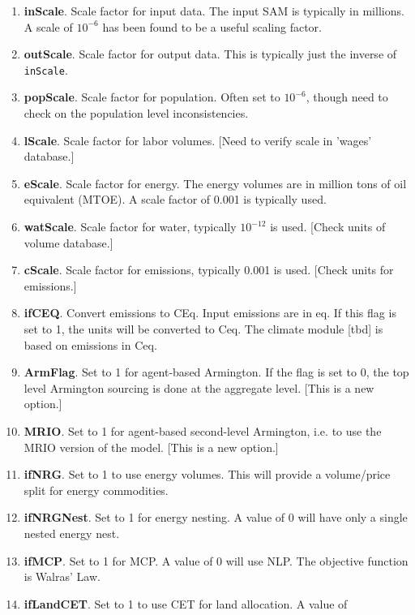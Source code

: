 \begin{enumerate}
   \item \textbf{inScale}. Scale factor for input data. The input SAM is
         typically in millions. A scale of $10^{-6}$ has been found to be a
         useful scaling factor.
   \item \textbf{outScale}. Scale factor for output data. This is typically just
         the inverse of \texttt{inScale}.
   \item \textbf{popScale}. Scale factor for population. Often set to $10^{-6}$,
         though need to check on the population level inconsistencies.
   \item \textbf{lScale}. Scale factor for labor volumes. [Need to verify scale
         in 'wages' database.]
   \item \textbf{eScale}. Scale factor for energy. The energy volumes are in
         million tons of oil equivalent (MTOE). A scale factor of 0.001 is
         typically used.
   \item \textbf{watScale}. Scale factor for water, typically $10^{-12}$ is
         used. [Check units of volume database.]
   \item \textbf{cScale}. Scale factor for emissions, typically 0.001 is used.
         [Check units for emissions.]
   \item \textbf{ifCEQ}. Convert emissions to CEq. Input emissions are in
         \COT{}eq. If this flag is set to 1, the units will be converted to Ceq.
         The climate module [tbd] is based on emissions in Ceq.
   \item \textbf{ArmFlag}. Set to 1 for agent-based Armington. If the flag is
         set to 0, the top level Armington sourcing is done at the aggregate
         level. [This is a new option.]
   \item \textbf{MRIO}. Set to 1 for agent-based second-level Armington, i.e.
   	     to use the MRIO version of the model. [This is a new option.]
   \item \textbf{ifNRG}. Set to 1 to use energy volumes. This will provide a
         volume/price split for energy commodities.
   \item \textbf{ifNRGNest}. Set to 1 for energy nesting. A value of 0 will have
         only a single nested energy nest.
   \item \textbf{ifMCP}. Set to 1 for MCP. A value of 0 will use NLP. The
         objective function is Walras' Law.
   \item \textbf{ifLandCET}. Set to 1 to use CET for land allocation. A value of

\end{enumerate}
